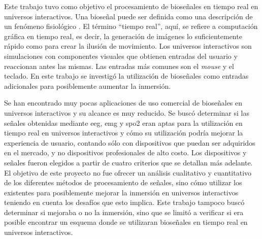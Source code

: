 Este trabajo tuvo como objetivo el procesamiento de bioseñales en tiempo real en universos interactivos. Una bioseñal puede ser definida como una descripción de un fenómeno fisiológico \cite{biosignal-book-2}.  El término ``tiempo real'', aquí, se refiere a computación gráfica en tiempo real, es decir, la generación de imágenes lo suficientemente rápido como para crear la ilusión de movimiento. Los universos interactivos son simulaciones con componentes visuales que obtienen entradas del usuario y reaccionan antes las mismas. Las entradas más comunes son el \emph{mouse} y el teclado. En este trabajo se investigó la utilización de bioseñales como entradas adicionales para posiblemente aumentar la inmersión.

Se han encontrado muy pocas aplicaciones de uso comercial de bioseñales en universos interactivos y su alcance es muy reducido\cite{neurogaming}. Se buscó determinar si las señales obtenidas mediante \acrshort{eeg}, \acrshort{emg} y \acrshort{spo2} eran aptas para la utilización en tiempo real en universos interactivos y cómo su utilización podría mejorar la experiencia de usuario, contando sólo con dispositivos que puedan ser adquiridos en el mercado, y no dispositivos profesionales de alto costo. Los dispositivos y señales fueron elegidos a partir de cuatro criterios que se detallan más adelante. El objetivo de este proyecto no fue ofrecer un análisis cualitativo y cuantitativo de los diferentes métodos de procesamiento de señales, sino cómo utilizar los existentes para posiblemente mejorar la inmersión en universos interactivos teniendo en cuenta los desafíos que esto implica. Este trabajo tampoco buscó determinar si mejoraba o no la inmersión, sino que se limitó a verificar si era posible encontrar un esquema donde se utilizaran bioseñales en tiempo real en universos interactivos.